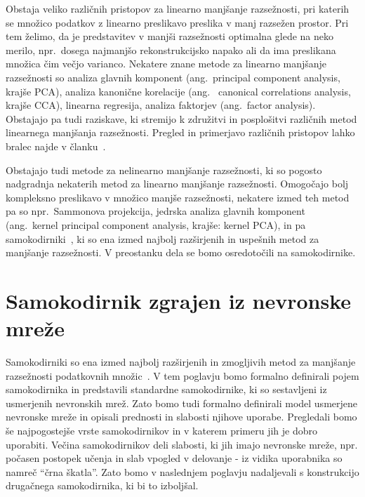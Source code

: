 \documentclass[12pt,a4paper,twoside]{article}
\theoremstyle{definition} %
\theoremstyle{plain} %
\numberwithin{equation}{section}  %
\begin{document}
Obstaja veliko različnih pristopov za linearno manjšanje razsežnosti, pri katerih se množico podatkov z linearno preslikavo preslika v manj razsežen prostor. 
Pri tem želimo, da je predstavitev v manjši razsežnosti optimalna glede na neko merilo, npr.\ dosega najmanjšo rekonstrukcijsko napako ali da ima preslikana množica čim večjo varianco. 
Nekatere znane metode za linearno manjšanje razsežnosti so analiza glavnih komponent (ang.~principal component analysis, krajše PCA), 
analiza kanonične korelacije (ang.~ canonical correlations analysis, krajše CCA), linearna regresija, analiza faktorjev (ang.~factor analysis).
Obstajajo pa tudi raziskave, ki stremijo k združitvi in posplošitvi različnih metod linearnega manjšanja razsežnosti. 
Pregled in primerjavo različnih pristopov lahko bralec najde v članku~\cite{JMLR:cunningham2015a}.

Obstajajo tudi metode za nelinearno manjšanje razsežnosti, ki so pogosto nadgradnja nekaterih metod za linearno manjšanje razsežnosti. 
Omogočajo bolj kompleksno preslikavo v množico manjše razsežnosti, nekatere izmed teh metod pa so npr.\ Sammonova projekcija, 
jedrska analiza glavnih komponent (ang.~kernel principal component analysis, krajše: kernel PCA), in pa samokodirniki~\cite{charte2018autoencoders}, ki so ena izmed najbolj razširjenih in uspešnih metod za manjšanje razsežnosti. 
V preostanku dela se bomo osredotočili na samokodirnike.



\section{Samokodirnik zgrajen iz nevronske mreže} %
\label{pogl:nn_samokodirniki}

Samokodirniki so ena izmed najbolj razširjenih in zmogljivih metod za manjšanje razsežnosti podatkovnih množic~\cite{charte2018autoencoders}.
V tem poglavju bomo formalno definirali pojem samokodirnika in predstavili standardne samokodirnike, ki so sestavljeni iz usmerjenih nevronskih mrež.
Zato bomo tudi formalno definirali model usmerjene nevronske mreže in opisali prednosti in slabosti njihove uporabe.
Pregledali bomo še najpogostejše vrste samokodirnikov in v katerem primeru jih je dobro uporabiti.
Večina samokodirnikov deli slabosti, ki jih imajo nevronske mreže, npr. počasen postopek učenja in slab vpogled v delovanje - iz vidika uporabnika so namreč ``črna škatla''.
Zato bomo v naslednjem poglavju nadaljevali s konstrukcijo drugačnega samokodirnika, ki bi to izboljšal.
\end{document}
